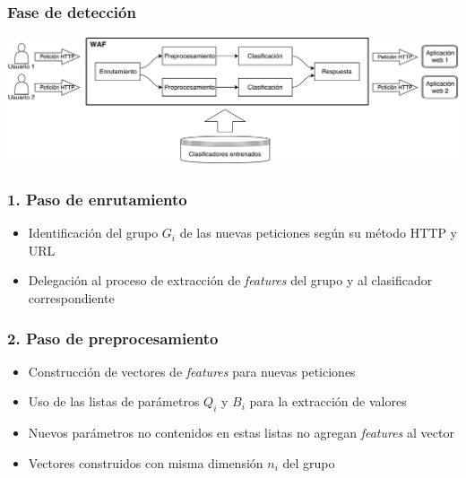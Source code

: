 \begin{frame}
    \frametitle{Fase de detección}

    \begin{center}
        \hspace*{-0.75cm}
        \includegraphics[width=1.1\textwidth]{images/waf-diagram-detection.png}
    \end{center}
\end{frame}

\begin{frame}
    \frametitle{1. Paso de enrutamiento}

    \begin{itemize}[<2->]
        \item
        Identificación del grupo $G_{i}$ de las nuevas peticiones según
        su método HTTP y URL

        \item
        Delegación al proceso de extracción de \textit{features} del
        grupo y al clasificador correspondiente
    \end{itemize}
\end{frame}

\begin{frame}
    \frametitle{2. Paso de preprocesamiento}

    \begin{itemize}[<2->]
        \item
        Construcción de vectores de \textit{features} para nuevas peticiones

        \item
        Uso de las listas de parámetros $Q_{i}$ y $B_{i}$ para la extracción
        de valores

        \item
        Nuevos parámetros no contenidos en estas listas no agregan
        \textit{features} al vector

        \item
        Vectores construidos con misma dimensión $n_{i}$ del grupo
    \end{itemize}
\end{frame}

